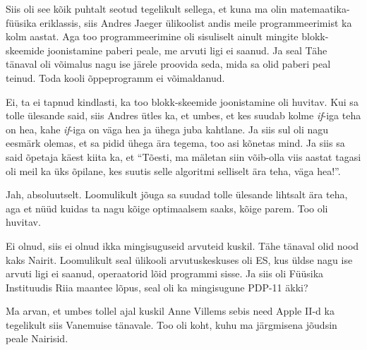 
Siis oli see kõik puhtalt seotud tegelikult sellega, et kuna ma olin 
matemaatika-füüsika eriklassis, siis  Andres Jaeger ülikoolist andis meile programmeerimist ka kolm aastat. Aga too 
programmeerimine oli sisuliselt ainult mingite blokk-skeemide joonistamine 
paberi peale, me arvuti ligi ei saanud. Ja seal Tähe tänaval oli võimalus nagu 
ise järele proovida  seda, mida sa olid  paberi peal teinud. 
Toda  kooli õppeprogramm ei võimaldanud.


Ei, ta ei tapnud kindlasti, ka too blokk-skeemide joonistamine 
oli huvitav. Kui sa tolle ülesande said, siis Andres ütles ka, et umbes, et kes 
suudab  kolme \emph{if}-iga teha on hea, kahe \emph{if}-iga on 
väga hea ja ühega juba kahtlane. Ja siis sul oli nagu eesmärk olemas, et sa 
pidid ühega ära tegema, too asi kõnetas mind. Ja siis sa said õpetaja käest 
kiita ka, et \enquote{Tõesti, ma mäletan siin võib-olla viis aastat tagasi oli 
meil ka üks õpilane, kes suutis selle algoritmi selliselt ära teha,  
väga hea!}.


Jah, absoluutselt. Loomulikult jõuga sa suudad tolle ülesande lihtsalt ära teha, aga et 
nüüd kuidas ta nagu kõige optimaalsem saaks, kõige parem. Too oli huvitav.


Ei olnud, siis ei olnud ikka mingisuguseid arvuteid kuskil. Tähe tänaval olid 
nood kaks Nairit. Loomulikult seal ülikooli arvutuskeskuses oli ES, kus üldse nagu ise arvuti 
ligi ei saanud,  operaatorid lõid programmi sisse. Ja siis oli Füüsika 
Instituudis Riia maantee lõpus, seal oli ka 
mingisugune PDP-11 äkki?

Ma arvan, et umbes tollel ajal kuskil Anne Villems 
sebis need Apple II-d ka tegelikult siis Vanemuise 
tänavale. Too oli koht, kuhu ma 
järgmisena jõudsin peale  Nairisid.  

